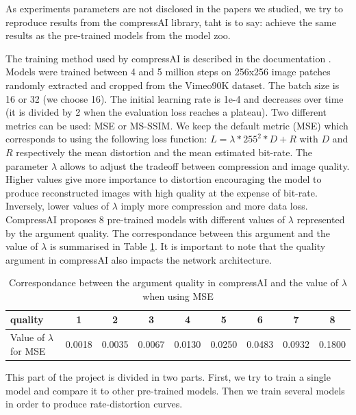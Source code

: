 As experiments parameters are not disclosed in the papers we studied, we try to reproduce results from the compressAI library, taht is to say: achieve the same results as the pre-trained models from the model zoo.

The training method used by compressAI is described in the documentation \cite{compressai_train}. Models were trained between 4 and 5 million steps on 256x256 image patches randomly extracted and cropped from the Vimeo90K dataset. The batch size is 16 or 32 (we choose 16). The initial learning rate is 1e-4 and decreases over time (it is divided by 2 when the evaluation loss reaches a plateau). Two different metrics can be used: MSE or MS-SSIM. We keep the default metric (MSE) which corresponds to using the following loss function: \(L = \lambda * 255^{2} * D + R\) with \(D\) and \(R\) respectively the mean distortion and the mean estimated bit-rate. The parameter \(\lambda\) allows to adjust the tradeoff between compression and image quality. Higher values give more importance to distortion encouraging the model to produce reconstructed images with high quality at the expense of bit-rate. Inversely, lower values of \(\lambda\) imply more compression and more data loss. CompressAI proposes 8 pre-trained models with different values of \(\lambda\) represented by the argument \textsf{quality}. The correspondance between this argument and the value of \(\lambda\) is summarised in Table \ref{tab}. It is important to note that the \textsf{quality} argument in compressAI also impacts the network architecture.

\begin{table}[]
    \centering
    \begin{tabular}{|l|c|c|c|c|c|c|c|c|}
    \hline
    \textsf{quality}                      & 1 & 2 & 3 & 4 & 5 & 6 & 7 & 8 \\ \hline
    Value of \(\lambda\) for MSE & 0.0018 & 0.0035 & 0.0067 & 0.0130 & 0.0250 & 0.0483 & 0.0932 & 0.1800 \\ \hline
    \end{tabular}
    \caption{Correspondance between the argument \textsf{quality} in compressAI and the value of \(\lambda\) when using MSE}
    \label{tab}
\end{table}

This part of the project is divided in two parts. First, we try to train a single model and compare it to other pre-trained models. Then we train several models in order to produce rate-distortion curves.

